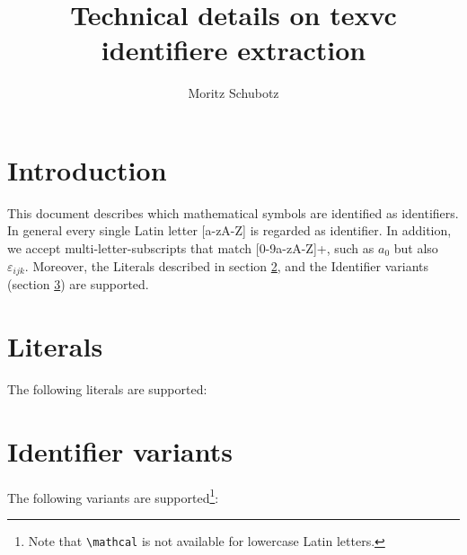 \documentclass[a4paper,12pt]{article}
\author{Moritz Schubotz}
\title{Technical details on texvc identifiere extraction}
\begin{document}
\maketitle
\section{Introduction}
This document describes which mathematical symbols are identified as identifiers.
In general every single Latin letter [a-zA-Z] is regarded as identifier.
In addition, we accept multi-letter-subscripts that match [0-9a-zA-Z]+, such as $a_0$ but also $\varepsilon_{ijk}$.
Moreover, the Literals described in section \ref{sc.lit}, and the Identifier variants (section \ref{sc.var}) are supported.
\section{Literals}\label{sc.lit}
The following literals are supported:



\section{Identifier variants}\label{sc.var}
The following variants are supported\footnote{Note that \texttt{\textbackslash mathcal} is not available for lowercase Latin letters.}:


\end{document}
